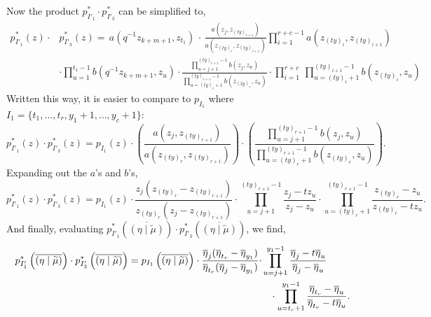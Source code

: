 \documentclass[ALCO]{cedram}
\newcommand{\etamutilde}{{(\eta \mid \widetilde{\mu})}}
\newcommand{\pstarone}{p^*_{I'_1}}
\newcommand{\pstarthree}{p^*_{I'_3}}
\begin{document}
Now the product $\pstarone \cdot \pstarthree$ can be simplified to,
\begin{align*} \pstarone(z) \cdot &\pstarthree(z)  = \,a(q^{-1}z_{k+m+1},z_{t_1})\, \cdot \,  \frac{a(z_j,z_{(ty)_{r+1}})}{a(z_{(ty)_r},z_{(ty)_{r+1}})} \prod_{i=1}^{r+c-1} a(z_{(ty)_i},z_{(ty)_{i+1}})  \\ &  \cdot \prod_{u=1}^{t_1-1} b(q^{-1} z_{k+m+1},z_u) \cdot \frac{\prod\limits_{u=j+1}^{(ty)_{r+1}-1} b(z_j,z_u)}{\prod\limits_{u=(ty)_r+1}^{(ty)_{r+1}-1} b(z_{(ty)_r},z_u)} \cdot  \prod_{i=1}^{r+c}\, \prod_{u=(ty)_{i}+1}^{(ty)_{i+1}-1} b\left(z_{(ty)_i},z_u \right) \end{align*}
Written this way, it is easier to compare to $p_{I_1}$ where $I_1 = \{ t_1, \dotsc, t_r, y_1+1,\dotsc,y_c+1 \}$:
\[ \pstarone(z) \cdot \pstarthree(z) = p_{I_1}(z) \cdot\left( \frac{a(z_j,z_{(ty)_{r+1}})}{a(z_{(ty)_r},z_{(ty)_{r+1}})} \right)\cdot \left( \frac{\prod\limits_{u=j+1}^{(ty)_{r+1}-1} b(z_j,z_u)}{\prod\limits_{u=(ty)_r+1}^{(ty)_{r+1}-1} b(z_{(ty)_r},z_u)}\right). \]
Expanding out the $a$'s and $b$'s,
\[ \pstarone(z) \cdot \pstarthree(z) = p_{I_1}(z) \cdot \frac{z_j(z_{(ty)_r}-z_{(ty)_{r+1}})}{z_{(ty)_r} (z_j-z_{(ty)_{r+1}})} \cdot \prod_{u=j+1}^{(ty)_{r+1}-1} \frac{z_j-tz_u}{z_j-z_u} \cdot \prod_{u=(ty)_r+1}^{(ty)_{r+1}-1} \frac{z_{(ty)_r}-z_u}{z_{(ty)_r}-tz_u}.\]
And finally, evaluating $\pstarone\left( \overline{\etamutilde} \right) \cdot \pstarthree\left( \overline{\etamutilde} \right)$, we find,
\begin{align*}\pstarone\left( \overline{\etamutilde} \right) \cdot \pstarthree\left( \overline{\etamutilde} \right) = p_{I_1}\left( \overline{\etamutilde} \right) \cdot \frac{\overline{\eta}_j(\overline{\eta}_{t_r} - \overline{\eta}_{y_1})}{\overline{\eta}_{t_r}(\overline{\eta}_j-\overline{\eta}_{y_1})}\cdot &\prod_{u=j+1}^{y_1-1} \frac{\overline{\eta}_j-t\overline{\eta}_u}{\overline{\eta}_j-\overline{\eta}_u}\\ & \hspace*{0.3cm} \cdot \prod_{u=t_r+1}^{y_1-1} \frac{\overline{\eta}_{t_r}-\overline{\eta}_u}{\overline{\eta}_{t_r}-t\overline{\eta}_u}. \end{align*}
\end{document}
